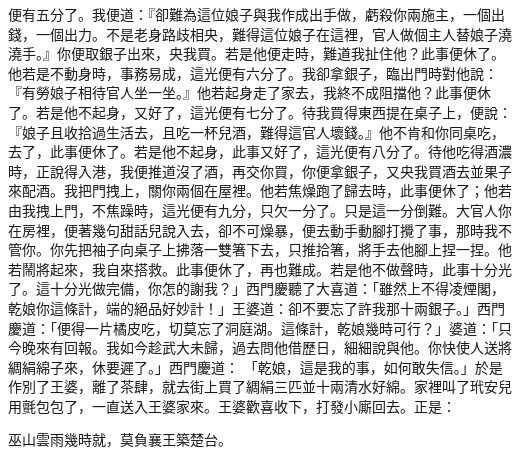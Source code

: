 \begin{showcontents}{}
便有五分了。我便道：『卻難為這位娘子與我作成出手做，虧殺你兩施主，一個出錢，一個出力。不是老身路歧相央，難得這位娘子在這裡，官人做個主人替娘子澆澆手。』你便取銀子出來，央我買。若是他便走時，難道我扯住他？此事便休了。他若是不動身時，事務易成，這光便有六分了。我卻拿銀子，臨出門時對他說：『有勞娘子相待官人坐一坐。』他若起身走了家去，我終不成阻擋他？此事便休了。若是他不起身，又好了，這光便有七分了。待我買得東西提在桌子上，便說：『娘子且收拾過生活去，且吃一杯兒酒，難得這官人壞錢。』他不肯和你同桌吃，去了，此事便休了。若是他不起身，此事又好了，這光便有八分了。待他吃得酒濃時，正說得入港，我便推道沒了酒，再交你買，你便拿銀子，又央我買酒去並果子來配酒。我把門拽上，關你兩個在屋裡。他若焦燥跑了歸去時，此事便休了；他若由我拽上門，不焦躁時，這光便有九分，只欠一分了。只是這一分倒難。大官人你在房裡，便著幾句甜話兒說入去，卻不可燥暴，便去動手動腳打攪了事，那時我不管你。你先把袖子向桌子上拂落一雙箸下去，只推拾箸，將手去他腳上捏一捏。他若鬧將起來，我自來搭救。此事便休了，再也難成。若是他不做聲時，此事十分光了。這十分光做完備，你怎的謝我？」西門慶聽了大喜道：「雖然上不得凌煙閣，乾娘你這條計，端的絕品好妙計！」王婆道：卻不要忘了許我那十兩銀子。」西門慶道：「便得一片橘皮吃，切莫忘了洞庭湖。這條計，乾娘幾時可行？」婆道：「只今晚來有回報。我如今趁武大未歸，過去問他借歷日，細細說與他。你快使人送將綢絹綿子來，休要遲了。」西門慶道： 「乾娘，這是我的事，如何敢失信。」於是作別了王婆，離了茶肆，就去街上買了綢絹三匹並十兩清水好綿。家裡叫了玳安兒用氈包包了，一直送入王婆家來。王婆歡喜收下，打發小廝回去。正是：

巫山雲雨幾時就，莫負襄王築楚台。


\end{showcontents}
